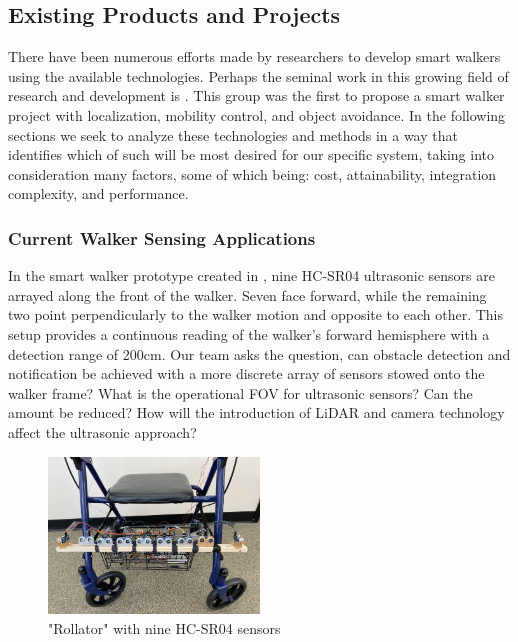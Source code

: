 \subsection{Existing Products and Projects}

\noindent There have been numerous efforts made by researchers to develop smart walkers using the available technologies. Perhaps the seminal work in this growing field of research and development is \cite{PAMM}. This group was the first to propose a smart walker project with localization, mobility control, and object avoidance. In the following sections we seek to analyze these technologies and methods in a way that identifies which of such will be most desired for our specific system, taking into consideration many factors, some of which being: cost, attainability, integration complexity, and performance.

\subsubsection{Current Walker Sensing Applications}
\noindent In the smart walker prototype created in \cite{Mostofa}, nine HC-SR04 ultrasonic sensors are arrayed along the front of the walker. Seven face forward, while the remaining two point perpendicularly to the walker motion and opposite to each other. This setup provides a continuous reading of the walker's forward hemisphere with a detection range of 200cm. Our team asks the question, can obstacle detection and notification be achieved with a more discrete array of sensors stowed onto the walker frame? What is the operational FOV for ultrasonic sensors? Can the amount be reduced? How will the introduction of LiDAR and camera technology affect the ultrasonic approach?\\

\begin{figure}[H]
	\centering
	\includegraphics[width=0.5\textwidth]{./Images/mostafa9.png}
	\caption{\label{fig:mostafa9}"Rollator" with nine HC-SR04 sensors \cite{Mostofa}}
\end{figure}


